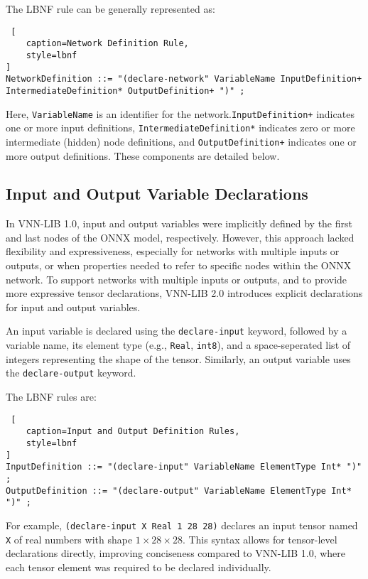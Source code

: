 The LBNF rule can be generally represented as:
\begin{lstlisting} [
	caption=Network Definition Rule, 
	style=lbnf
]
NetworkDefinition ::= "(declare-network" VariableName InputDefinition+ IntermediateDefinition* OutputDefinition+ ")" ;
\end{lstlisting}
Here, \texttt{VariableName} is an identifier for the network.\texttt{InputDefinition+} indicates one or more input definitions, \texttt{IntermediateDefinition*} 
indicates zero or more intermediate (hidden) node definitions, and \texttt{OutputDefinition+} indicates one or more output definitions. These components are detailed below.

\subsection{Input and Output Variable Declarations}
In VNN-LIB 1.0, input and output variables were implicitly defined by the first and last nodes of the ONNX model, respectively. However, this approach lacked flexibility and expressiveness,
especially for networks with multiple inputs or outputs, or when properties needed to refer to specific nodes within the ONNX network. To support networks with multiple inputs or outputs, 
and to provide more expressive tensor declarations, VNN-LIB 2.0 introduces explicit declarations for input and output variables.

An input variable is declared using the \texttt{declare-input} keyword, followed by a variable name, its element type (e.g., \texttt{Real}, \texttt{int8}), and a space-seperated list of integers 
representing the shape of the tensor. Similarly, an output variable uses the \texttt{declare-output} keyword.

The LBNF rules are:
\begin{lstlisting} [
	caption=Input and Output Definition Rules, 
	style=lbnf
]
InputDefinition ::= "(declare-input" VariableName ElementType Int* ")" ;
OutputDefinition ::= "(declare-output" VariableName ElementType Int* ")" ;
\end{lstlisting}
For example, \texttt{(declare-input X Real 1 28 28)} declares an input tensor named \texttt{X} of real numbers with shape $1 \times 28 \times 28$. This syntax allows for tensor-level 
declarations directly, improving conciseness compared to VNN-LIB 1.0, where each tensor element was required to be declared individually.


